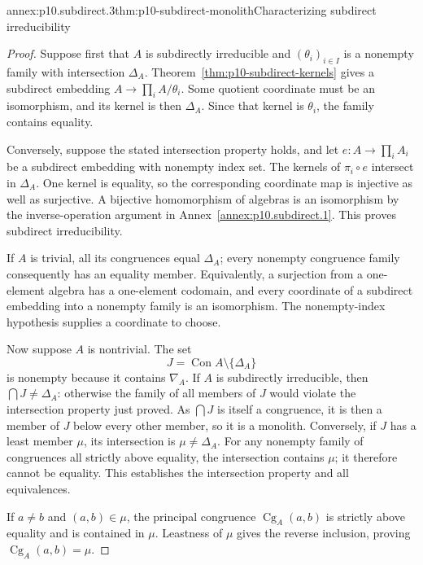 \begin{annexitem}{annex:p10.subdirect.3}{thm:p10-subdirect-monolith}{Characterizing subdirect irreducibility}
\begin{proof}
Suppose first that \(A\) is subdirectly irreducible and
\((\theta_i)_{i\in I}\) is a nonempty family with intersection
\(\Delta_A\).
Theorem~\ref{thm:p10-subdirect-kernels} gives a subdirect embedding
\(A\to\prod_i A/\theta_i\).
Some quotient coordinate must be an isomorphism, and its kernel
is then \(\Delta_A\).  Since that kernel is \(\theta_i\), the
family contains equality.

Conversely, suppose the stated intersection property holds, and
let \(e:A\to\prod_i A_i\) be a subdirect embedding with nonempty
index set.  The kernels of \(\pi_i\circ e\) intersect in
\(\Delta_A\).
One kernel is equality, so the corresponding coordinate map is
injective as well as surjective.  A bijective homomorphism of
algebras is an isomorphism by the inverse-operation argument in
Annex~\ref{annex:p10.subdirect.1}.
This proves subdirect irreducibility.

If \(A\) is trivial, all its congruences equal \(\Delta_A\);
every nonempty congruence family consequently has an equality
member.  Equivalently, a surjection from a one-element algebra
has a one-element codomain, and every coordinate of a subdirect
embedding into a nonempty family is an isomorphism.
The nonempty-index hypothesis supplies a coordinate to choose.

Now suppose \(A\) is nontrivial.  The set
\[
 J=\operatorname{Con}A\setminus\{\Delta_A\}
\]
is nonempty because it contains \(\nabla_A\).
If \(A\) is subdirectly irreducible, then
\(\bigcap J\ne\Delta_A\): otherwise the family of all members
of \(J\) would violate the intersection property just proved.
As \(\bigcap J\) is itself a congruence, it is then a member of
\(J\) below every other member, so it is a monolith.
Conversely, if \(J\) has a least member \(\mu\), its intersection
is \(\mu\ne\Delta_A\).
For any nonempty family of congruences all strictly above equality,
the intersection contains \(\mu\); it therefore cannot be equality.
This establishes the intersection property and all equivalences.

If \(a\ne b\) and \((a,b)\in\mu\), the principal congruence
\(\operatorname{Cg}_A(a,b)\) is strictly above equality and is
contained in \(\mu\).  Leastness of \(\mu\) gives the reverse
inclusion, proving \(\operatorname{Cg}_A(a,b)=\mu\).
\end{proof}
\end{annexitem}

